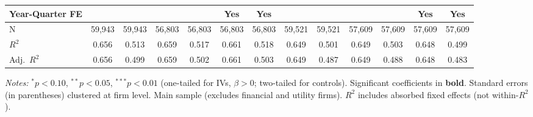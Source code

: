 \begin{landscape}
\begin{table}[H]
\begin{tabular}{lcccccccccccc}
Year-Quarter FE &  &  &  &  & Yes & Yes &  &  &  &  & Yes & Yes \\
\midrule
N & 59,943 & 59,943 & 56,803 & 56,803 & 56,803 & 56,803 & 59,521 & 59,521 & 57,609 & 57,609 & 57,609 & 57,609 \\
$R^2$ & 0.656 & 0.513 & 0.659 & 0.517 & 0.661 & 0.518 & 0.649 & 0.501 & 0.649 & 0.503 & 0.648 & 0.499 \\
Adj.~$R^2$ & 0.656 & 0.499 & 0.659 & 0.502 & 0.661 & 0.503 & 0.649 & 0.487 & 0.649 & 0.488 & 0.648 & 0.483 \\
\bottomrule
\end{tabular}
\begin{minipage}{\linewidth}
\vspace{2pt}\scriptsize
\textit{Notes:} $^{*}p<0.10$, $^{**}p<0.05$, $^{***}p<0.01$ (one-tailed for IVs, $\beta > 0$; two-tailed for controls).
 Significant coefficients in \textbf{bold}.
 Standard errors (in parentheses) clustered at firm level.
 Main sample (excludes financial and utility firms).
 $R^2$ includes absorbed fixed effects (not within-$R^2$).
\end{minipage}
\end{table}
\end{landscape}